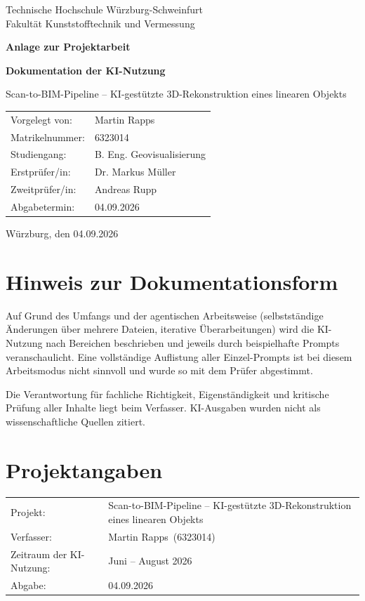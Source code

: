 \documentclass[12pt,a4paper]{article}
\newcommand{\thwsAuthor}{Martin Rapps}
\newcommand{\thwsMatriculation}{6323014}
\newcommand{\thwsDegree}{B. Eng. Geovisualisierung}
\newcommand{\thwsFirstExaminer}{Dr. Markus Müller}
\newcommand{\thwsSecondExaminer}{Andreas Rupp}
\newcommand{\thwsSubmissionDate}{04.09.2026}
\begin{document}
\thispagestyle{empty}
\begin{center}
	{\large Technische Hochschule Würzburg-Schweinfurt\\
	Fakultät Kunststofftechnik und Vermessung\par}
	\vfill
	{\LARGE\bfseries Anlage zur Projektarbeit\par}
	\vspace{1.0cm}
	{\Large\bfseries Dokumentation der KI-Nutzung\par}
	\vspace{0.6cm}
	{\large Scan-to-BIM-Pipeline -- KI-gestützte 3D-Rekonstruktion eines linearen Objekts\par}
	\vfill
	\begin{tabular}{@{}ll@{}}
		Vorgelegt von: & \thwsAuthor\\
		Matrikelnummer: & \thwsMatriculation\\
		Studiengang: & \thwsDegree\\
		Erstprüfer/in: & \thwsFirstExaminer\\
		Zweitprüfer/in: & \thwsSecondExaminer\\
		Abgabetermin: & \thwsSubmissionDate
	\end{tabular}
	\vfill
	Würzburg, den \thwsSubmissionDate
\end{center}
\clearpage

\section*{Hinweis zur Dokumentationsform}
Auf Grund des Umfangs und der agentischen Arbeitsweise (selbstständige Änderungen über mehrere Dateien, iterative Überarbeitungen) wird die KI-Nutzung nach Bereichen beschrieben und jeweils durch beispielhafte Prompts veranschaulicht. Eine vollständige Auflistung aller Einzel-Prompts ist bei diesem Arbeitsmodus nicht sinnvoll und wurde so mit dem Prüfer abgestimmt.

Die Verantwortung für fachliche Richtigkeit, Eigenständigkeit und kritische Prüfung aller Inhalte liegt beim Verfasser. KI-Ausgaben wurden nicht als wissenschaftliche Quellen zitiert.

\tableofcontents
\clearpage
{}

\section{Projektangaben}

\begin{tabular}{@{}ll@{}}
Projekt: & Scan-to-BIM-Pipeline -- KI-gestützte 3D-Rekonstruktion eines linearen Objekts \\
Verfasser: & \thwsAuthor\ (\thwsMatriculation) \\
Zeitraum der KI-Nutzung: & Juni -- August 2026 \\
Abgabe: & \thwsSubmissionDate \\
\end{tabular}
\end{document}
